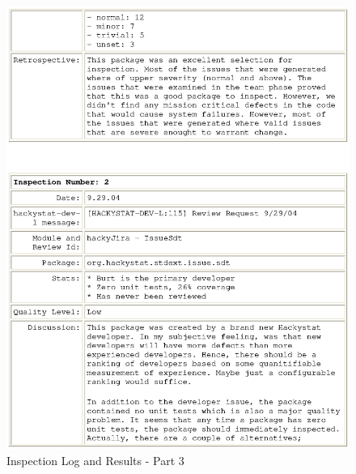 \begin{figure}[htbp]
  \centering
  \includegraphics[width=1.0\textwidth]{figs/engineeringlog_word_html_3.eps}
  \caption{Inspection Log and Results - Part 3}
  \label{fig:log3}
\end{figure}

